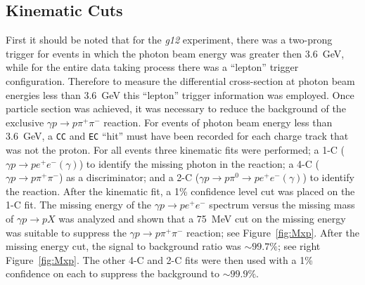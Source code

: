 \documentclass{aip-cp}
\def\g12{\emph{g12}}
\newcommand{\abbr}[1]{\textsc{\texttt{#1}}}
\begin{document}
\subsection{Kinematic Cuts}
First it should be noted that for the \g12 experiment, there was a two-prong trigger for events in which the photon beam energy was greater then 3.6~GeV, while for the entire data taking process there was a ``lepton'' trigger configuration. Therefore to measure the differential cross-section at photon beam energies less than 3.6~GeV this ``lepton'' trigger information was employed. 
Once particle section was achieved, it was necessary to reduce the background of the exclusive $\gamma p \to p \pi^{+}\pi^{-}$ reaction. For events of photon beam energy less than 3.6~GeV, a \abbr{CC} and \abbr{EC} ``hit'' must have been recorded for each charge track that was not the proton. For all events three kinematic fits were performed; a 1-C ( $\gamma p \to p e^{+}e^{-}(\gamma)$) to identify the missing photon in the reaction; a 4-C ($\gamma p \to p \pi^{+}\pi^{-}$) as a discriminator; and a 2-C ($\gamma p \to p \pi^0 \to pe^{+}e^{-}(\gamma)$) to identify the reaction. After the kinematic fit, a 1\% confidence level cut was placed on the 1-C fit. The missing energy of the $\gamma p \to p e^{+}e^{-}$ spectrum versus the missing mass of $\gamma p \to p X$ was analyzed and shown that a 75~MeV cut on the missing energy was suitable to suppress the $\gamma p \to p \pi^{+}\pi^{-}$ reaction; see Figure~\ref{fig:Mxp}. After the missing energy cut, the signal to background ratio was $\sim 99.7\%$; see right Figure~\ref{fig:Mxp}. The other 4-C and 2-C fits were then used with a 1\% confidence on each to suppress the background to $\sim 99.9\%$.
\end{document}
